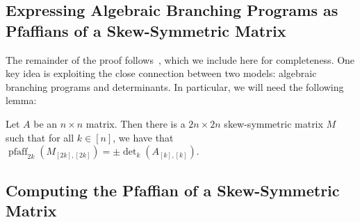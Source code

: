 \documentclass[10pt,a4paper]{amsart}
\DeclareMathOperator{\pfaff}{pfaff}
\begin{document}
\subsection{Expressing Algebraic Branching Programs as Pfaffians of a Skew-Symmetric Matrix}

The remainder of the proof follows~\cite{AF21}, which we include here for completeness.
One key idea is exploiting the close connection between two models: algebraic branching programs and determinants.
In particular, we will need the following lemma:

\begin{lem}[{\cite[Lemma 4.3]{AF21}}]\label{lem:skew_symmetrization}
  Let $A$ be an $n\times n$ matrix.
  Then there is a $2n \times 2n$ skew-symmetric matrix $M$ such that for all $k \in [n]$, we have that $\pfaff_{2k}(M_{[2k], [2k]}) = \pm \det_k(A_{[k], [k]})$.
\end{lem}

\subsection{Computing the Pfaffian of a Skew-Symmetric Matrix}
\end{document}
